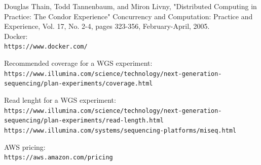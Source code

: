 \documentclass{article}
\begin{document}
Douglas Thain, Todd Tannenbaum, and Miron Livny, "Distributed Computing in Practice: The Condor Experience" Concurrency and Computation: Practice and Experience, Vol. 17, No. 2-4, pages 323-356, February-April, 2005.\\

Docker:\\
\texttt{https://www.docker.com/}

Recommended coverage for a WGS experiment:\\
\texttt{https://www.illumina.com/science/technology/next-generation-sequencing/plan-experiments/coverage.html}

Read lenght for a WGS experiment:\\
\texttt{https://www.illumina.com/science/technology/next-generation-sequencing/plan-experiments/read-length.html}\\
\texttt{https://www.illumina.com/systems/sequencing-platforms/miseq.html}

AWS pricing:\\
\texttt{https://aws.amazon.com/pricing}
\end{document}
